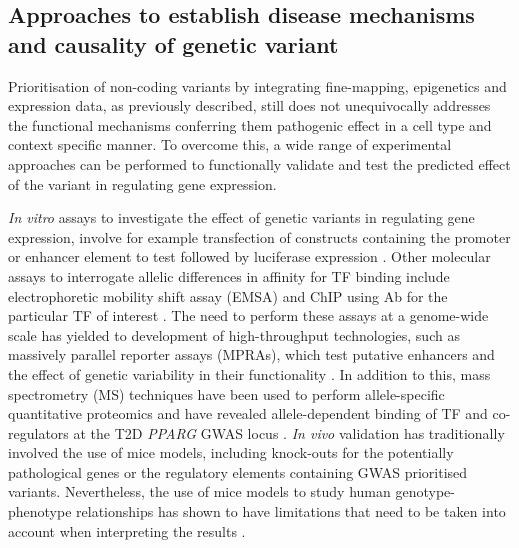 


\subsection{Approaches to establish disease mechanisms and causality of genetic variant}

Prioritisation of non-coding variants by integrating fine-mapping, epigenetics and expression data, as previously described, still does not unequivocally addresses the functional mechanisms conferring them pathogenic effect in a cell type and context specific manner. To overcome this, a wide range of experimental approaches can be performed to functionally validate and test the predicted effect of the variant in regulating gene expression. 

\textit{In vitro} assays to investigate the effect of genetic variants in regulating gene expression, involve for example transfection of constructs containing the promoter or enhancer element to test followed by luciferase expression \parencite{Niimi2002}. Other molecular assays to interrogate allelic differences in affinity for TF binding include electrophoretic mobility shift assay (EMSA) and ChIP using Ab for the particular TF of interest \parencite{Vernes2007}. The need to perform these assays at a genome-wide scale has yielded to development of high-throughput technologies, such as massively parallel reporter assays (MPRAs), which test putative enhancers and the effect of genetic variability in their functionality \parencite{Kheradpour2013}. In addition to this, mass spectrometry (MS) techniques have been used to perform allele-specific quantitative proteomics and have revealed allele-dependent binding of TF and co-regulators at the T2D \textit{PPARG} GWAS locus \parencite{Lee2017}. \textit{In vivo} validation has traditionally involved the use of mice models, including knock-outs for the potentially pathological genes or the regulatory elements containing GWAS prioritised variants. Nevertheless, the use of mice models to study human genotype-phenotype relationships has shown to have limitations that need to be taken into account when interpreting the results \parencite{Ermann2012}. 

